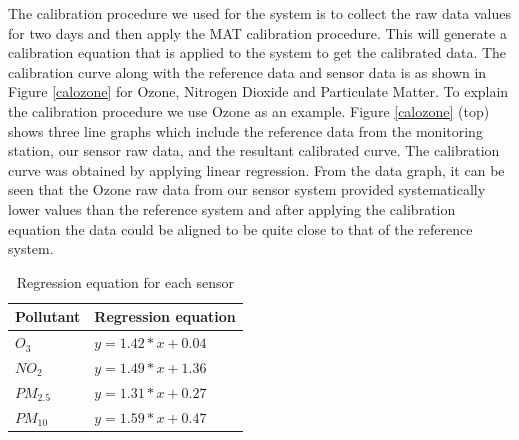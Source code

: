 The calibration procedure we used for the system is to collect the raw data values for two days and then apply the MAT calibration procedure. This will generate a calibration equation that is applied to the system to get the calibrated data. 
The calibration curve along with the reference data and sensor data is as shown in  Figure \ref{calozone} for Ozone, Nitrogen Dioxide and Particulate Matter. To explain the calibration procedure we use Ozone as an example. Figure \ref{calozone}  (top) shows three line graphs which include the reference data from the monitoring station, our sensor raw data, and the resultant calibrated curve. The calibration curve was obtained by applying linear regression. From the data graph, it can be seen that the Ozone raw data from our sensor system provided systematically lower values than the reference system and after applying the calibration equation the data could be aligned to be quite close to that of the reference system.



\begingroup
\setlength{\tabcolsep}{10pt} %
\renewcommand{\arraystretch}{2.0} %
\begin{table}[h]
  
  
  \begin{tabularx}{\columnwidth}{X|X}
      \hline
      Pollutant          & Regression equation \\
      \hline
  
   
    
    




    
    $O_{3}$   & $y = 1.42 * x + 0.04$  \\ 
    $NO_{2}$   & $y = 1.49 * x + 1.36$ \\ 
    $PM_{2.5}$   & $y = 1.31 * x + 0.27$\\ 
    $PM_{10}$   & $y = 1.59* x + 0.47$ \\ \hline
  
   
      
    
\end{tabularx}
 
  \caption{Regression equation for each sensor}
  \label{tableequation}
  \hspace{1 cm}
\end{table}
\endgroup











